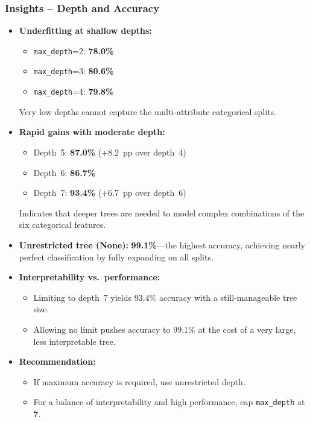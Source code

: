 \subsubsection*{Insights – Depth and Accuracy}
\begin{itemize}
	\item \textbf{Underfitting at shallow depths:}
	      \begin{itemize}
		      \item \texttt{max\_depth}=2: \textbf{78.0\%}
		      \item \texttt{max\_depth}=3: \textbf{80.6\%}
		      \item \texttt{max\_depth}=4: \textbf{79.8\%}
	      \end{itemize}
	      Very low depths cannot capture the multi‑attribute categorical splits.
	\item \textbf{Rapid gains with moderate depth:}
	      \begin{itemize}
		      \item Depth 5: \textbf{87.0\%} (+8.2 pp over depth 4)
		      \item Depth 6: \textbf{86.7\%}
		      \item Depth 7: \textbf{93.4\%} (+6.7 pp over depth 6)
	      \end{itemize}
	      Indicates that deeper trees are needed to model complex combinations of the six categorical features.
	\item \textbf{Unrestricted tree (None):} \textbf{99.1\%}—the highest accuracy, achieving nearly perfect classification by fully expanding on all splits.
	\item \textbf{Interpretability vs.\ performance:}
	      \begin{itemize}
		      \item Limiting to depth 7 yields 93.4\% accuracy with a still‑manageable tree size.
		      \item Allowing no limit pushes accuracy to 99.1\% at the cost of a very large, less interpretable tree.
	      \end{itemize}
	\item \textbf{Recommendation:}
	      \begin{itemize}
		      \item If maximum accuracy is required, use unrestricted depth.
		      \item For a balance of interpretability and high performance, cap \texttt{max\_depth} at \textbf{7}.
	      \end{itemize}
\end{itemize}
